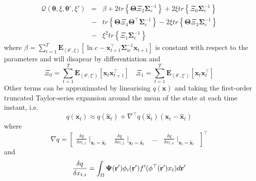 \documentclass[]{article}
\begin{document}
\begin{eqnarray}
 \mathcal Q(\boldsymbol \theta,\xi,\boldsymbol\theta',\xi')&=&\beta+2 tr\left\lbrace \boldsymbol\Theta\Xi_2\boldsymbol\Sigma_e^{-1}\right\rbrace +2\xi tr \left\lbrace  \Xi_0\boldsymbol\Sigma_e^{-1}\right\rbrace  \nonumber \\
&-&tr \left\lbrace\boldsymbol\Theta\Xi_4 \boldsymbol\Theta^\top\boldsymbol\Sigma_e^{-1}\right\rbrace -2\xi tr \left\lbrace \boldsymbol\Theta\Xi_3\boldsymbol\Sigma_e^{-1}\right\rbrace  \nonumber \\
&-&\xi^2 tr \left\lbrace \Xi_1\boldsymbol\Sigma_e^{-1}\right\rbrace  \nonumber
\end{eqnarray}
where  $\beta= \sum_{t=1}^T\mathbf E_{(\theta',\xi)}[ \ln c-\mathbf x_{t+1}^\top\boldsymbol\Sigma_w^{-1}\mathbf x_{t+1}]$ is constant with respect to the parameters and will disapear by differentiation and 
\begin{equation}
 \Xi_0=\sum_{t=1}^T\mathbf E_{(\theta',\xi')}[\mathbf x_t\mathbf x_{t+1}^\top] \quad \Xi_1=\sum_{t=1}^T\mathbf E_{(\theta',\xi')}[\mathbf x_t\mathbf x_t^\top]
\end{equation}
Other terms can be approximated by linearising $q(\mathbf x)$ and taking the first-order truncated  Taylor-series expansion around the mean of the state at each time instant, i.e. 
\begin{equation}\label{eq:qTaylor}
 q(\mathbf x_t)\approx q(\hat{\mathbf x}_t)+\nabla^\top q (\hat{\mathbf x}_t)(\mathbf x_t -\hat{\mathbf x}_t)
\end{equation}
where
\begin{equation}
\nabla q=\begin{bmatrix}\frac{\delta q}{\delta x_{t,1}} \mid_{{\mathbf x}_t=\mathbf{\hat x}_t} &\frac{\delta q}{\delta x_{t,2}} \mid_{{\mathbf x}_t=\mathbf{\hat x}_t}& \dots &\frac{\delta q}{\delta x_{t,n}} \mid_{{\mathbf x}_t=\mathbf{\hat x}_t}\end{bmatrix}^\top
\end{equation}
and
\begin{equation}
\frac{\delta q}{\delta x_{t,i}}= \int_\Omega \boldsymbol{\Psi}(\mathbf{r}')\phi_i(\mathbf r') f'(\phi^\top(\mathbf{r}'){x}_t) d\mathbf{r}'\\
\end{equation}
\end{document}
